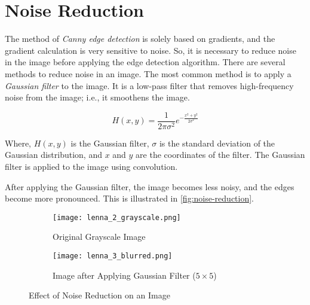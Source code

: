 \section{Noise Reduction}
\label{sec:noise-reduction}

The method of \emph{Canny edge detection} is solely based on gradients, and the gradient calculation is very sensitive to noise. So, it is necessary to reduce noise in the image before applying the edge detection algorithm. There are several methods to reduce noise in an image. The most common method is to apply a \emph{Gaussian filter} to the image. It is a low-pass filter that removes high-frequency noise from the image; i.e., it smoothens the image.

\begin{equation}
    \label{eq:gaussian-filter}
    H(x, y) = \frac{1}{2\pi\sigma^2}e^{-\frac{x^2 + y^2}{2\sigma^2}}
\end{equation}

Where, $H(x, y)$ is the Gaussian filter, $\sigma$ is the standard deviation of the Gaussian distribution, and $x$ and $y$ are the coordinates of the filter. The Gaussian filter is applied to the image using convolution.

After applying the Gaussian filter, the image becomes less noisy, and the edges become more pronounced. This is illustrated in \autoref{fig:noise-reduction}.

\begin{figure}[ht]
    \centering
    \begin{subfigure}[b]{0.4\textwidth}
        \centering
        \texttt{[image: lenna\_2\_grayscale.png]}
        \caption{Original Grayscale Image}
        \label{fig:grayscale-original}
    \end{subfigure}
    \hfill
    \begin{subfigure}[b]{0.4\textwidth}
        \centering
        \texttt{[image: lenna\_3\_blurred.png]}
        \caption{Image after Applying Gaussian Filter ($5\times5$)}
        \label{fig:gaussian-filter}
    \end{subfigure}
    \caption{Effect of Noise Reduction on an Image}
    \label{fig:noise-reduction}
\end{figure}
